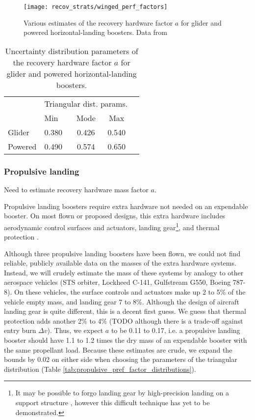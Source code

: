 \documentclass[conf]{../paper/new-aiaa}
\begin{document}
\begin{figure}[hbt!]
    \centering
    \texttt{[image: recov\_strats/winged\_perf\_factors]}
    \caption{\label{fig:winged_perf_factors} Various estimates of the recovery hardware factor $a$ for glider and powered horizontal-landing boosters. Data from \cite{Hellman2005, Isakowitz2004, Healy1998, Sippel2003}}
\end{figure}

\begin{table}[hbt!]
    \centering
    \caption{\label{tab:winged_pref_factor_distributions} Uncertainty distribution parameters of the recovery hardware factor $a$ for glider and powered horizontal-landing boosters.}
    \begin{tabular}{l l c c c}
    \hline
     & \multicolumn{3}{c}{Triangular dist. params.} \\
    & Min & Mode & Max \\
    \hline
    \hline
    Glider  & 0.380 & 0.426 & 0.540 \\
    Powered & 0.490 & 0.574 & 0.650 \\
    \hline
    \end{tabular}
\end{table}

\subsubsection{Propulsive landing}

Need to estimate recovery hardware mass factor $a$.

Propulsive landing boosters require extra hardware not needed on an expendable booster. On most flown or proposed designs, this extra hardware includes aerodynamic control surfaces and actuators, landing gear\footnote{It may be possible to forgo landing gear by high-precision landing on a support structure \cite{Musk2017}, however this difficult technique has yet to be demonstrated.}, and thermal protection \cite{NewGlenn, Falcon9, DCX, Musk2017}.

Although three propulsive landing boosters have been flown, we could not find reliable, publicly available data on the masses of the extra hardware systems. Instead, we will crudely estimate the mass of these systems by analogy to other aerospace vehicles (STS orbiter, Lockheed C-141, Gulfstream G550, Boeing 787-8). On these vehicles, the surface controls and actuators make up 2 to 5\% of the vehicle empty mass, and landing gear 7 to 8\%. Although the design of aircraft landing gear is quite different, this is a decent first guess. We guess that thermal protection adds another 2\% to 4\% (TODO although there is a trade-off against entry burn $\Delta v$). Thus, we expect $a$ to be 0.11 to 0.17, i.e. a propulsive landing booster should have 1.1 to 1.2 times the dry mass of an expendable booster with the same propellant load. Because these estimates are crude, we expand the bounds by 0.02 on either side when choosing the parameters of the triangular distribution (Table \ref{tab:propulsive_pref_factor_distributions}).
\end{document}
